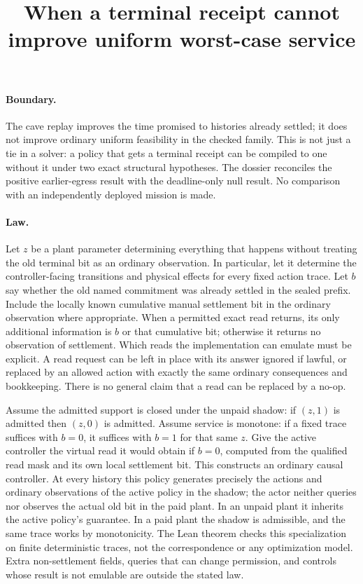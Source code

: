 \documentclass{article}
\title{When a terminal receipt cannot improve uniform worst-case service}
\author{}
\date{}
\begin{document}
\maketitle
\paragraph{Boundary.}
The cave replay improves the time promised to histories already
settled; it does not improve ordinary uniform feasibility in the
checked family. This is not just a tie in a solver: a policy that
gets a terminal receipt can be compiled to one without it under
two exact structural hypotheses. The dossier reconciles the positive
earlier-egress result with the deadline-only null result. No
comparison with an independently deployed mission is made.

\paragraph{Law.}
Let $z$ be a plant parameter determining everything that happens
without treating the old terminal bit as an ordinary observation.
In particular, let it determine the controller-facing transitions
and physical effects for every fixed action trace. Let $b$ say
whether the old named commitment was already settled in the
sealed prefix. Include the locally known cumulative manual
settlement bit in the ordinary observation where appropriate.
When a permitted exact read returns, its only additional information
is $b$ or that cumulative bit; otherwise it returns no observation
of settlement. Which reads the implementation can emulate must be
explicit. A read request can be left in place with its answer ignored
if lawful, or replaced by an allowed action with exactly the same
ordinary consequences and bookkeeping. There is no general claim
that a read can be replaced by a no-op.

Assume the admitted support is closed under the unpaid shadow:
if $(z,1)$ is admitted then $(z,0)$ is admitted. Assume service is
monotone: if a fixed trace suffices with $b=0$, it suffices with
$b=1$ for that same $z$. Give the active controller the virtual
read it would obtain if $b=0$, computed from the qualified read
mask and its own local settlement bit. This constructs an ordinary
causal controller. At every history this policy generates precisely
the actions and ordinary observations of the active policy in the
shadow; the actor neither queries nor observes the actual old
bit in the paid plant. In an unpaid plant it inherits the active
policy's guarantee. In a paid plant the shadow is admissible, and
the same trace works by monotonicity. The Lean theorem checks this
specialization on finite deterministic traces, not the
correspondence or any optimization model. Extra non-settlement fields,
queries that can change permission, and controls whose result is not
emulable are outside the stated law.
\end{document}
